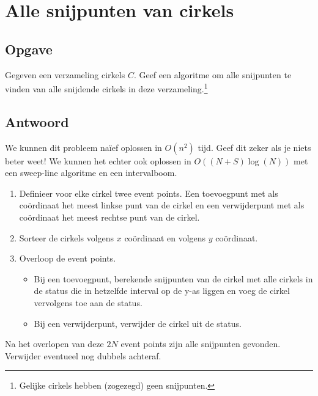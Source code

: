 \documentclass[examenvragen.tex]{subfiles}
\begin{document}
\section{Alle snijpunten van cirkels}
\subsection{Opgave}
Gegeven een verzameling cirkels $C$. Geef een algoritme om alle snijpunten te vinden van alle snijdende cirkels in deze verzameling.\footnote{Gelijke cirkels hebben (zogezegd) geen snijpunten.}

\subsection{Antwoord}
We kunnen dit probleem na\"ief oplossen in $O(n^2)$ tijd. Geef dit zeker als je niets beter weet! We kunnen het echter ook oplossen in $O((N+S)\log(N))$ met een sweep-line algoritme en een intervalboom.

\begin{enumerate}
\item Definieer voor elke cirkel twee event points. Een toevoegpunt met als co\"ordinaat het meest linkse punt van de cirkel en een verwijderpunt met als co\"ordinaat het meest rechtse punt van de cirkel.
\item Sorteer de cirkels volgens $x$ co\"ordinaat en volgens $y$ co\"ordinaat.
\item Overloop de event points.
\begin{itemize}
\item Bij een toevoegpunt, berekende snijpunten van de cirkel met alle cirkels in de status die in hetzelfde interval op de y-as liggen en voeg de cirkel vervolgens toe aan de status.
\item Bij een verwijderpunt, verwijder de cirkel uit de status.
\end{itemize}
\end{enumerate}
Na het overlopen van deze $2N$ event points zijn alle snijpunten gevonden. Verwijder eventueel nog dubbels achteraf.
\end{document}
